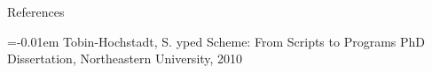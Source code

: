 \documentclass[landscape,final,a0paper,fontscale=0.277]{baposter}
\begin{document}
\begin{poster}
\begin{posterbox}[name=references,column=2,below=conclusion]{References}
  \smaller
  
  \renewcommand{\section}[2]{\vskip 0.05em}
  \begin{thebibliography}{1}\itemsep=-0.01em
    \setlength{\baselineskip}{0.4em}
    Tobin-Hochstadt, S.
    yped {S}cheme: {F}rom {S}cripts to {P}rograms
    \newblock PhD Dissertation,
    \newblock Northeastern University, 2010
  \end{thebibliography}
  \vspace{0.3em}

\end{posterbox}

\end{poster}
\end{document}
